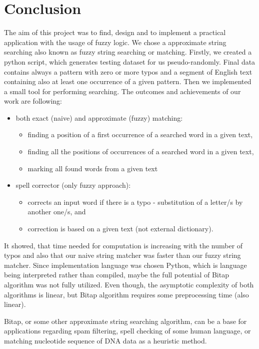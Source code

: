 \documentclass[12pt,a4paper,titlepage,final]{article}
\begin{document}
\section{Conclusion} \label{conclusion}
The aim of this project was to find, design and to implement a practical application with the usage of fuzzy logic. We chose a approximate string searching also known as fuzzy string searching or matching. Firstly, we created a python script, which generates testing dataset for us pseudo-randomly. Final data contains always a pattern with zero or more typos and a segment of English text containing also at least one occurrence of a given pattern. Then we implemented a small tool for performing searching. The outcomes and achievements of our work are following:
	\begin{itemize}
		\item both exact (naive) and approximate (fuzzy) matching:
			\begin{itemize}
 				\item finding a position of a first occurrence of a searched word in a given text,
 				\item finding all the positions of occurrences of a searched word in a given text,
				\item marking all found words from a given text
			\end{itemize} 	
		\item spell corrector (only fuzzy approach):
 			\begin{itemize}
 				\item corrects an input word if there is a typo - substitution of a letter/s by another one/s, and
				\item correction is based on a given text (not external dictionary).
			\end{itemize} 	
	\end{itemize}

It showed, that time needed for computation is increasing with the number of typos and also that our naive string matcher was faster than our fuzzy string matcher. Since implementation language was chosen Python, which is language being interpreted rather than compiled, maybe the full potential of Bitap algorithm was not fully utilized. Even though, the asymptotic complexity of both algorithms is linear, but Bitap algorithm requires some preprocessing time (also linear).

Bitap, or some other approximate string searching algorithm, can be a base for applications regarding spam filtering, spell checking of some human language, or matching nucleotide sequence of DNA data as a heuristic method. 

\newpage



\end{document}
